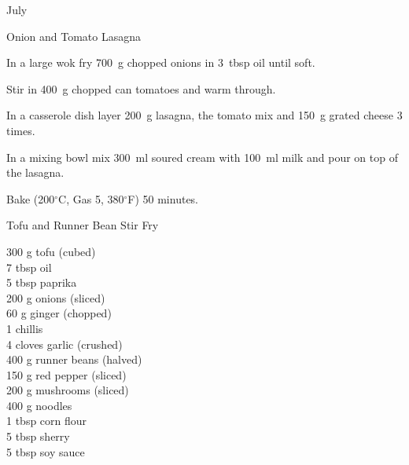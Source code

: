 \begin{menu}{July}
\begin{recipe}{2}{Onion and Tomato Lasagna}
\begin{ingredients}
		\end{ingredients}
	
	
	
    \begin{instructions}
    \item 
        In a large wok fry
        700~g chopped onions
        in
        3~tbsp  oil
        until soft.
      \item 
        Stir in 400~g chopped can tomatoes
        and warm through.
      \item 
        In a casserole dish layer
        200~g  lasagna,
        the tomato mix and
        150~g grated cheese
        3 times.
      \item 
        In a mixing bowl mix
        300~ml  soured cream
        with
        100~ml  milk
        and pour on top of the lasagna.
      \item 
        Bake (200$^{\circ}$C, Gas 5, 380$^{\circ}$F) 50 minutes.
      
    \end{instructions}
    \end{recipe}%
  
    \begin{recipe}{2}{Tofu and Runner Bean Stir Fry}%
		\begin{ingredients}
		300 g tofu (cubed) \\
	7 tbsp oil  \\
	5 tbsp paprika  \\
	200 g onions (sliced) \\
	60 g ginger (chopped) \\
	1  chillis  \\
	4 cloves garlic (crushed) \\
	400 g runner beans (halved) \\
	150 g red pepper (sliced) \\
	200 g mushrooms (sliced) \\
	400 g noodles  \\
	1 tbsp corn flour  \\
	5 tbsp sherry  \\
	5 tbsp soy sauce  \\
	
		\end{ingredients}
	
	

\end{recipe}
\end{menu}
